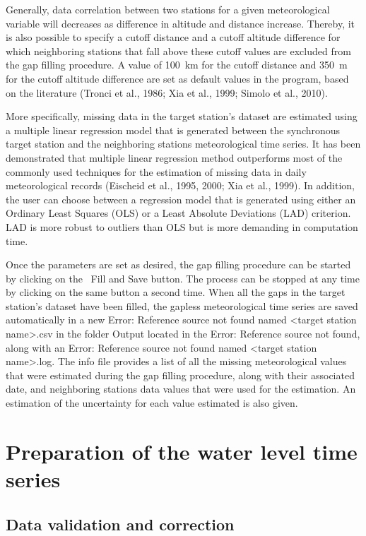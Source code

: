\documentclass[12pt, letterpaper, fleqn]{report}
\begin{document}
Generally, data correlation between two stations for a given meteorological variable will decreases as difference in altitude and distance increase. Thereby, it is also possible to specify a cutoff distance and a cutoff altitude difference for which neighboring stations that fall above these cutoff values are excluded from the gap filling procedure. A value of 100 km for the cutoff distance and 350 m for the cutoff altitude difference are set as default values in the program, based on the literature (Tronci et al., 1986; Xia et al., 1999; Simolo et al., 2010).

More specifically, missing data in the target station's dataset are estimated using a multiple linear regression model that is generated between the synchronous target station and the neighboring stations meteorological time series. It has been demonstrated that multiple linear regression method outperforms most of the commonly used techniques for the estimation of missing data in daily meteorological records (Eischeid et al., 1995, 2000; Xia et al., 1999). In addition, the user can choose between a regression model that is generated using either an Ordinary Least Squares (OLS) or a Least Absolute Deviations (LAD) criterion. LAD is more robust to outliers than OLS but is more demanding in computation time.

Once the parameters are set as desired, the gap filling procedure can be started by clicking on the        Fill and Save button. The process can be stopped at any time by clicking on the same button a second time. When all the gaps in the target station's dataset have been filled, the gapless meteorological time series are saved automatically in a new Error: Reference source not found named <target station name>.csv in the folder Output located in the Error: Reference source not found, along with an Error: Reference source not found named <target station name>.log. The info file provides a list of all the missing meteorological values that were estimated during the gap filling procedure, along with their associated date, and neighboring stations data values that were used for the estimation. An estimation of the uncertainty for each value estimated is also given.

\section{Preparation of the water level time series}

\subsection{Data validation and correction}
\end{document}
